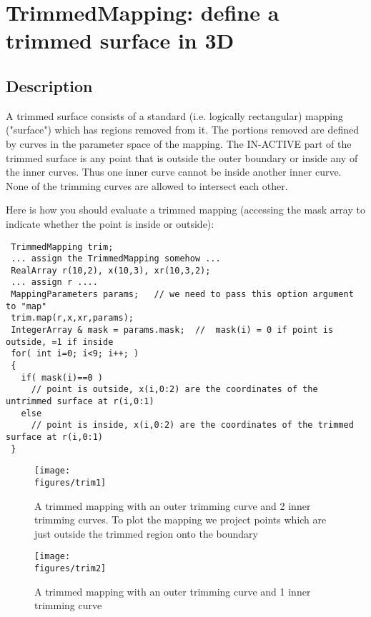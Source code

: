 \section{TrimmedMapping: define a trimmed surface in 3D }

\subsection{Description}

  A trimmed surface consists of a standard (i.e. logically rectangular) mapping ("surface") 
which has regions removed from it. The portions removed are defined by curves in the
parameter space of the mapping. The IN-ACTIVE part of the trimmed surface is any point
that is outside the outer boundary or inside any of the inner curves. Thus one inner
curve cannot be inside another inner curve. None of the trimming curves are allowed
to intersect each other.
  
Here is how you should evaluate a trimmed mapping (accessing the mask array to indicate
whether the point is inside or outside):
{\footnotesize
\begin{verbatim}
 TrimmedMapping trim;
 ... assign the TrimmedMapping somehow ...
 RealArray r(10,2), x(10,3), xr(10,3,2);
 ... assign r ....
 MappingParameters params;   // we need to pass this option argument to "map"         
 trim.map(r,x,xr,params);
 IntegerArray & mask = params.mask;  //  mask(i) = 0 if point is outside, =1 if inside
 for( int i=0; i<9; i++; )
 {
   if( mask(i)==0 )
     // point is outside, x(i,0:2) are the coordinates of the untrimmed surface at r(i,0:1)
   else
     // point is inside, x(i,0:2) are the coordinates of the trimmed surface at r(i,0:1)
 }
\end{verbatim}
}


\begin{figure}[ht]
  \begin{center}
    \texttt{[image: \\figures/trim1]}
  \caption{A trimmed mapping with an outer trimming curve and 2 inner trimming curves.
     To plot the mapping we project points which are just outside the trimmed region onto the boundary}
  \end{center}
\label{fig:TrimmedMapping1}
\end{figure}

\begin{figure}[ht]
  \begin{center}
    \texttt{[image: \\figures/trim2]}
  \caption{A trimmed mapping with an outer trimming curve and 1 inner trimming curve}
  \end{center}
\label{fig:TrimmedMapping2}
\end{figure}

